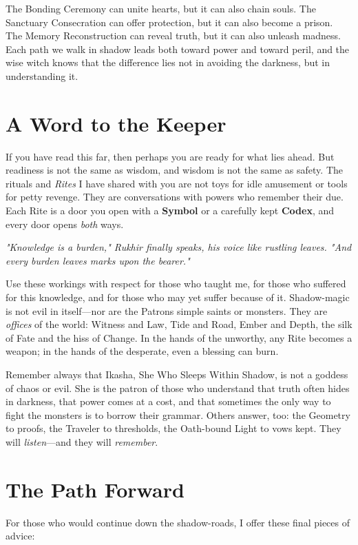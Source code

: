 \documentclass[12pt,twoside]{book}
\newcommand{\shadow}[1]{\textit{#1}}
\begin{document}
The Bonding Ceremony can unite hearts, but it can also chain souls. The Sanctuary Consecration can offer protection, but it can also become a prison. The Memory Reconstruction can reveal truth, but it can also unleash madness. Each path we walk in shadow leads both toward power and toward peril, and the wise witch knows that the difference lies not in avoiding the darkness, but in understanding it.

\section*{A Word to the Keeper}

If you have read this far, then perhaps you are ready for what lies ahead. But readiness is not the same as wisdom, and wisdom is not the same as safety. The rituals and \emph{Rites} I have shared with you are not toys for idle amusement or tools for petty revenge. They are conversations with powers who remember their due. Each Rite is a door you open with a \textbf{Symbol} or a carefully kept \textbf{Codex}, and every door opens \emph{both} ways.

\shadow{"Knowledge is a burden," Rukhir finally speaks, his voice like rustling leaves. "And every burden leaves marks upon the bearer."}

Use these workings with respect for those who taught me, for those who suffered for this knowledge, and for those who may yet suffer because of it. Shadow-magic is not evil in itself—nor are the Patrons simple saints or monsters. They are \emph{offices} of the world: Witness and Law, Tide and Road, Ember and Depth, the silk of Fate and the hiss of Change. In the hands of the unworthy, any Rite becomes a weapon; in the hands of the desperate, even a blessing can burn.

Remember always that Ikasha, She Who Sleeps Within Shadow, is not a goddess of chaos or evil. She is the patron of those who understand that truth often hides in darkness, that power comes at a cost, and that sometimes the only way to fight the monsters is to borrow their grammar. Others answer, too: the Geometry to proofs, the Traveler to thresholds, the Oath-bound Light to vows kept. They will \emph{listen}—and they will \emph{remember}.

\section*{The Path Forward}

For those who would continue down the shadow-roads, I offer these final pieces of advice:
\end{document}
